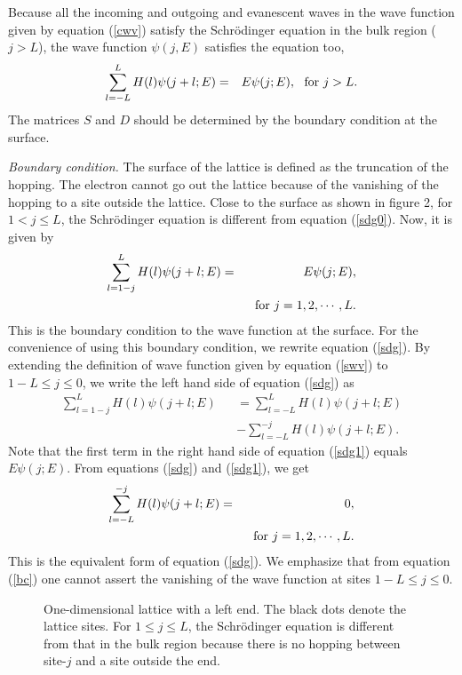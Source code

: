 \documentclass[aps,pra,amsmath,twocolumn,showpacs,bibnotes,10pt]{revtex4-1}
\begin{document}
Because all the incoming and outgoing and evanescent waves in the wave function given by equation (\ref{cwv}) satisfy the Schr\"odinger equation in the bulk region ($j > L$), the wave function $\psi(j,E)$ satisfies the equation too,
\begin{eqnarray}
\sum_{l=-L}^{L}H(l)\psi(j+l;E) &=& E\psi(j;E),  ~~{\rm for}~j>L. \label{sdg0} 
\end{eqnarray} 
The matrices $S$ and $D$ should be determined by the boundary condition at the surface. 

{\it Boundary condition.} 
The surface of the lattice is defined as the truncation of the hopping. The electron cannot go out the lattice because of the vanishing of the hopping to a site outside the lattice. Close to the surface as shown in figure 2, for $1<j \le L$, the Schr\"odinger equation is different from equation (\ref{sdg0}). Now, it is given by 
\begin{eqnarray}
\sum_{l=1-j}^{L}H(l)\psi(j+l;E) &=& E\psi(j;E),   \label{sdg}\\
&&~~{\rm for}~j=1,2,\cdots,L.\nonumber
\end{eqnarray}
This is the boundary condition to the wave function at the surface. For the convenience of using this boundary condition, we rewrite equation (\ref{sdg}). By extending the definition of wave function given by equation (\ref{swv}) to $1-L \le j \le 0$, we write the left hand side of equation (\ref{sdg}) as
\begin{eqnarray}
\sum_{l=1-j}^{L}H(l)\psi(j+l;E)&&=\sum_{l=-L}^{L}H(l)\psi(j+l;E)\nonumber\\
&&-\sum_{l=-L}^{-j}H(l)\psi(j+l;E).    \label{sdg1}
\end{eqnarray}
Note that the first term in the right hand side of equation (\ref{sdg1}) equals $E\psi(j;E)$. From equations (\ref{sdg}) and (\ref{sdg1}), we get
\begin{eqnarray}
\sum_{l=-L}^{-j}H(l)\psi(j+l;E) &=& 0,   \label{bc}\\
&&~~{\rm for}~j=1,2,\cdots,L.\nonumber
\end{eqnarray}
This is the equivalent form of equation (\ref{sdg}). We emphasize that from equation (\ref{bc}) one cannot assert the vanishing of the wave function at sites $1-L \le j \le 0$. 

\begin{figure}[t]
\centerline{}
\caption{One-dimensional lattice with a left end. The black dots denote the lattice sites. For $1 \le j \le L$, the Schr\"odinger equation is different from that in the bulk region because there is no hopping between site-$j$ and a site outside the end.} 
\end{figure}
\end{document}
